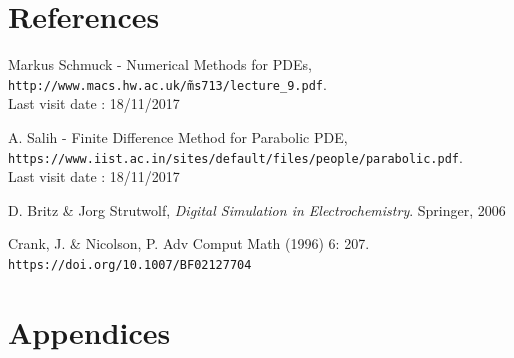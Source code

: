 \documentclass{article}
\begin{document}
    \section{References}
    \begin{thebibliography}{9}
        
        Markus Schmuck - Numerical Methods for PDEs,
        \\\texttt{http://www.macs.hw.ac.uk/\~ms713/lecture\_9.pdf}.
        \\Last visit date : 18/11/2017

        A. Salih - Finite Difference Method for Parabolic PDE,
        \\\texttt{https://www.iist.ac.in/sites/default/files/people/parabolic.pdf}.
        \\Last visit date : 18/11/2017

        D. Britz \& Jorg Strutwolf, \textit{Digital Simulation in Electrochemistry}.
        Springer, 2006

        Crank, J. & Nicolson, P. Adv Comput Math (1996) 6: 207. 
        \\\texttt{https://doi.org/10.1007/BF02127704}
        
    \end{thebibliography}
    \newpage
    \section{Appendices}
\end{document}
